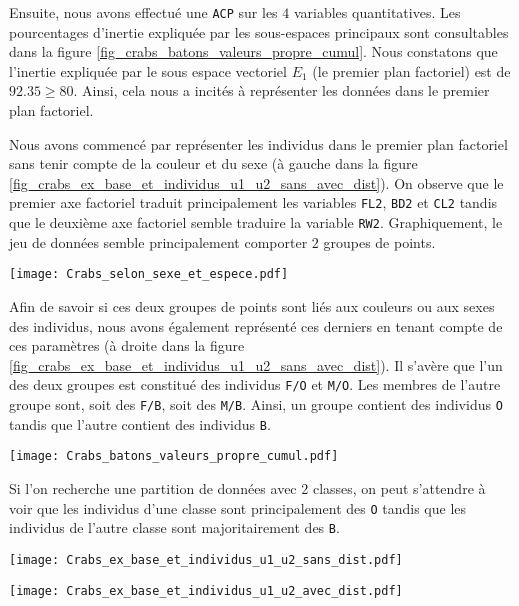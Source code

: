 \documentclass{article}
\begin{document}
\begin{multicols}{2}
Ensuite, nous avons effectué une \texttt{ACP} sur les $4$ variables quantitatives. Les pourcentages d'inertie expliquée par les sous-espaces principaux sont consultables dans la figure \ref{fig_crabs_batons_valeurs_propre_cumul}. Nous constatons que l'inertie expliquée par le sous espace vectoriel $E_1$ (le premier plan factoriel) est de $92.35 \geq 80$. Ainsi, cela nous a incités à représenter les données dans le premier plan factoriel.

Nous avons commencé par représenter les individus dans le premier plan factoriel sans tenir compte de la couleur et du sexe (à gauche dans la figure \ref{fig_crabs_ex_base_et_individus_u1_u2_sans_avec_dist}). On observe que le premier axe factoriel traduit principalement les variables \texttt{FL2}, \texttt{BD2} et \texttt{CL2} tandis que le deuxième axe factoriel semble traduire la variable \texttt{RW2}. Graphiquement, le jeu de données semble principalement comporter $2$ groupes de points.

\begingroup
   \centering
   \texttt{[image: Crabs\_selon\_sexe\_et\_espece.pdf]}
    \label{fig_crabs_selon_sexe_et_espece}
\endgroup

Afin de savoir si ces deux groupes de points sont liés aux couleurs ou aux sexes des individus, nous avons également représenté ces derniers en tenant compte de ces paramètres (à droite dans la figure \ref{fig_crabs_ex_base_et_individus_u1_u2_sans_avec_dist}). Il s'avère que l'un des deux groupes est constitué des individus \texttt{F/O} et \texttt{M/O}. Les membres de l'autre groupe sont, soit des \texttt{F/B}, soit des \texttt{M/B}. Ainsi, un groupe contient des individus \texttt{O} tandis que l'autre contient des individus \texttt{B}.

\begingroup
   \centering
   \texttt{[image: Crabs\_batons\_valeurs\_propre\_cumul.pdf]}
    \label{fig_crabs_batons_valeurs_propre_cumul}
\endgroup

Si l'on recherche une partition de données avec $2$ classes, on peut s'attendre à voir que les individus d'une classe sont principalement des \texttt{O} tandis que les individus de l'autre classe sont majoritairement des \texttt{B}.

\begingroup
	\centering
   \begin{minipage}[c]{0.23\textwidth}
      \centering \texttt{[image: Crabs\_ex\_base\_et\_individus\_u1\_u2\_sans\_dist.pdf]}
   \end{minipage}\hfill
   \begin{minipage}[c]{0.23\textwidth}   
      \centering \texttt{[image: Crabs\_ex\_base\_et\_individus\_u1\_u2\_avec\_dist.pdf]}
   \end{minipage}
     \label{fig_crabs_ex_base_et_individus_u1_u2_sans_avec_dist}
\endgroup



\end{multicols}
\end{document}
